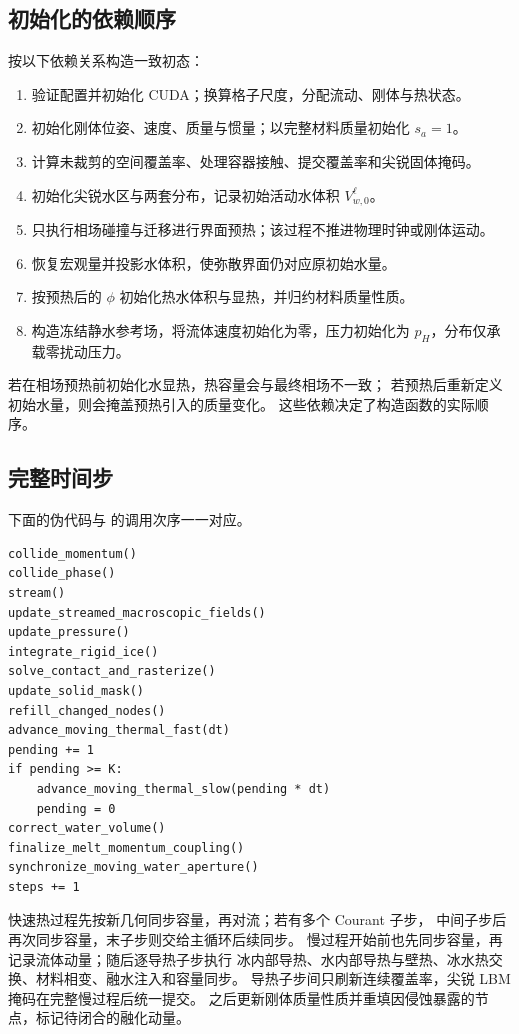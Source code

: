 \subsection{初始化的依赖顺序}
 按以下依赖关系构造一致初态：
\begin{enumerate}
 \item 验证配置并初始化 CUDA；换算格子尺度，分配流动、刚体与热状态。
 \item 初始化刚体位姿、速度、质量与惯量；以完整材料质量初始化 $s_a=1$。
 \item 计算未裁剪的空间覆盖率、处理容器接触、提交覆盖率和尖锐固体掩码。
 \item 初始化尖锐水区与两套分布，记录初始活动水体积 $V_{w,0}^{\ell}$。
 \item 只执行相场碰撞与迁移进行界面预热；该过程不推进物理时钟或刚体运动。
 \item 恢复宏观量并投影水体积，使弥散界面仍对应原初始水量。
 \item 按预热后的 $\phi$ 初始化热水体积与显热，并归约材料质量性质。
 \item 构造冻结静水参考场，将流体速度初始化为零，压力初始化为 $p_H$，分布仅承载零扰动压力。
\end{enumerate}
若在相场预热前初始化水显热，热容量会与最终相场不一致；
若预热后重新定义初始水量，则会掩盖预热引入的质量变化。
这些依赖决定了构造函数的实际顺序。

\subsection{完整时间步}
下面的伪代码与  的调用次序一一对应。
\begin{lstlisting}[caption={一个 LBM 步的调度；pending 记录待处理慢热步数}]
collide_momentum()
collide_phase()
stream()
update_streamed_macroscopic_fields()
update_pressure()
integrate_rigid_ice()
solve_contact_and_rasterize()
update_solid_mask()
refill_changed_nodes()
advance_moving_thermal_fast(dt)
pending += 1
if pending >= K:
    advance_moving_thermal_slow(pending * dt)
    pending = 0
correct_water_volume()
finalize_melt_momentum_coupling()
synchronize_moving_water_aperture()
steps += 1
\end{lstlisting}
快速热过程先按新几何同步容量，再对流；若有多个 Courant 子步，
中间子步后再次同步容量，末子步则交给主循环后续同步。
慢过程开始前也先同步容量，再记录流体动量；随后逐导热子步执行
冰内部导热、水内部导热与壁热、冰水热交换、材料相变、融水注入和容量同步。
导热子步间只刷新连续覆盖率，尖锐 LBM 掩码在完整慢过程后统一提交。
之后更新刚体质量性质并重填因侵蚀暴露的节点，标记待闭合的融化动量。


